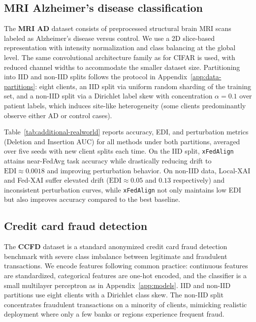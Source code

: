 \documentclass{article}
\theoremstyle{plain}
\theoremstyle{definition}
\theoremstyle{remark}
\begin{document}
\subsection{MRI Alzheimer’s disease classification}

The \textbf{MRI AD} dataset consists of preprocessed structural brain MRI scans labeled as Alzheimer’s disease versus control. We use a 2D slice-based representation with intensity normalization and class balancing at the global level. The same convolutional architecture family as for CIFAR is used, with reduced channel widths to accommodate the smaller dataset size. Partitioning into IID and non-IID splits follows the protocol in Appendix~\ref{app:data-partitions}: eight clients, an IID split via uniform random sharding of the training set, and a non-IID split via a Dirichlet label skew with concentration $\alpha = 0.1$ over patient labels, which induces site-like heterogeneity (some clients predominantly observe either AD or control cases).

Table~\ref{tab:additional-realworld} reports accuracy, EDI, and perturbation metrics (Deletion and Insertion AUC) for all methods under both partitions, averaged over five seeds with new client splits each time. On the IID split, \texttt{xFedAlign} attains near-FedAvg task accuracy while drastically reducing drift to $\mathrm{EDI}\approx 0.0018$ and improving perturbation behavior. On non-IID data, Local-XAI and Fed-XAI suffer elevated drift ($\mathrm{EDI}\approx 0.05$ and $0.13$ respectively) and inconsistent perturbation curves, while \texttt{xFedAlign} not only maintains low EDI but also improves accuracy compared to the best baseline.

\subsection{Credit card fraud detection}

The \textbf{CCFD} dataset is a standard anonymized credit card fraud detection benchmark with severe class imbalance between legitimate and fraudulent transactions. We encode features following common practice: continuous features are standardized, categorical features are one-hot encoded, and the classifier is a small multilayer perceptron as in Appendix~\ref{app:models}. IID and non-IID partitions use eight clients with a Dirichlet class skew. The non-IID split concentrates fraudulent transactions on a minority of clients, mimicking realistic deployment where only a few banks or regions experience frequent fraud.
\end{document}
